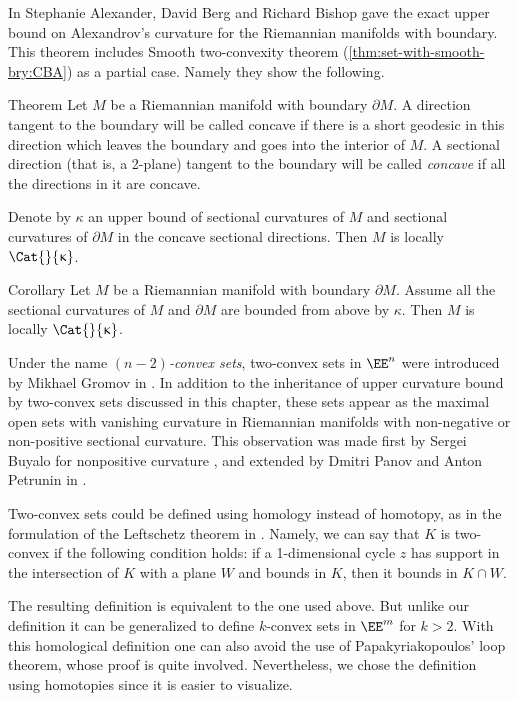 In \cite{a-b-b:CBA-m-w-b} Stephanie Alexander, David Berg and Richard Bishop gave the exact upper bound on Alexandrov's curvature for the Riemannian manifolds with boundary.
This theorem includes Smooth two-convexity theorem (\ref{thm:set-with-smooth-bry:CBA}) as a partial case.
Namely they show the following.

\begin{thm}{Theorem}
Let $M$ be a Riemannian manifold with boundary $\partial M$.
A direction tangent to the boundary will be called concave if there is a short geodesic in this direction which leaves the boundary and goes into the interior of $M$.
A sectional direction (that is, a 2-plane) 
tangent to the boundary 
will be called \emph{concave} if all the directions in it are concave.

Denote by $\kappa$ an upper bound of sectional curvatures of $M$ and  
sectional curvatures of $\partial M$ in the concave sectional directions. 
Then $M$ is locally $\Cat{}{\kappa}$. 
\end{thm}

\begin{thm}{Corollary}
Let $M$ be a Riemannian manifold with boundary $\partial M$. 
Assume all the sectional curvatures of $M$ and $\partial M$ are bounded from above by $\kappa$.
Then $M$ is locally $\Cat{}{\kappa}$.
\end{thm}

Under the name \emph{$(n-2)$-convex sets}, 
two-convex sets in $\EE^n$ were introduced by Mikhael Gromov in \cite{gromov:SaGMC}.
In addition to the inheritance of upper curvature bound by two-convex sets discussed in this chapter, 
these sets appear as the maximal open sets with vanishing curvature in  Riemannian manifolds with non-negative or non-positive sectional curvature.
This observation was made first by Sergei Buyalo for nonpositive curvature \cite[Lemma 5.8]{buyalo}, 
and extended by Dmitri Panov and Anton Petrunin in \cite{panov-petrunin:sweeping}.

Two-convex sets could be defined using homology instead of homotopy, as in the formulation of the Leftschetz theorem in \cite[\S\textonehalf]{gromov:SaGMC}.
Namely, we can say that $K$ is two-convex if the following condition holds: if a 1-dimensional cycle $z$ has support in the intersection of $K$ with a plane $W$ and bounds in $K$, then it bounds in $K\cap W$.

The resulting definition is equivalent to the one used above.
 But unlike our definition it can be generalized to define $k$-convex sets in $\EE^m$ for $k>2$.
With this homological definition one can also avoid the use of Papakyriakopoulos' loop theorem, whose proof is quite involved.
Nevertheless, we chose the definition using homotopies  since it is easier to visualize.

